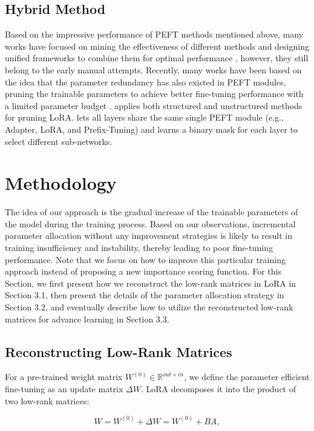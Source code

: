 \subsection{Hybrid Method} Based on the impressive performance of PEFT methods mentioned above, many works have focused on mining the effectiveness of different methods and designing unified frameworks to combine them for optimal performance \cite{c:17,c:18,c:19}, however, they still belong to the early manual attempts. Recently, many works have been based on the idea that the parameter redundancy has also existed in PEFT modules, pruning the trainable parameters to achieve better fine-tuning performance with a limited parameter budget \cite{c:20,c:21,c:2}. \citet{c:2} applies both structured and unstructured methods for pruning LoRA. \citet{c:21} lets all layers share the same single PEFT module (e.g., Adapter, LoRA, and Prefix-Tuning) and learns a binary mask for each layer to select different sub-networks.

\section{Methodology}
The idea of our approach is the gradual increase of the trainable parameters of the model during the training process. Based on our observations, incremental parameter allocation without any improvement strategies is likely to result in training insufficiency and instability, thereby leading to poor fine-tuning performance. Note that we focus on how to improve this particular training approach instead of proposing a new importance scoring function. For this Section, we first present how we reconstruct the low-rank matrices in LoRA in Section 3.1, then present the details of the parameter allocation strategy in Section 3.2, and eventually describe how to utilize the reconstructed low-rank matrices for advance learning in Section 3.3.

\subsection{Reconstructing Low-Rank Matrices} For a pre-trained weight matrix $W^{\left( 0 \right)}\in \mathbb{R}^{out\times in}$, we define the parameter efficient fine-tuning as an update matrix $\Delta W$. LoRA \cite{peft:lora} decomposes it into the product of two low-rank matrices:

\begin{equation}
\label{eq:1}
W=W^{\left( 0 \right)}+ \Delta W=W^{\left( 0 \right)}+BA ,
\end{equation}


